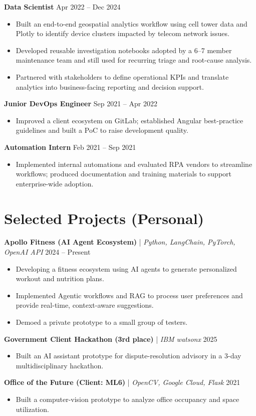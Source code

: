 \documentclass[10pt,a4paper]{article}
\begin{document}
\textbf{Data Scientist} \hfill Apr 2022 -- Dec 2024\\
\begin{itemize}
  \item Built an end-to-end geospatial analytics workflow using cell tower data and Plotly to identify device clusters impacted by telecom network issues.
  \item Developed reusable investigation notebooks adopted by a 6--7 member maintenance team and still used for recurring triage and root-cause analysis.
  \item Partnered with stakeholders to define operational KPIs and translate analytics into business-facing reporting and decision support.
\end{itemize}
\textbf{Junior DevOps Engineer} \hfill Sep 2021 -- Apr 2022\\
\begin{itemize}
  \item Improved a client ecosystem on GitLab; established Angular best-practice guidelines and built a PoC to raise development quality.
\end{itemize}
\textbf{Automation Intern} \hfill Feb 2021 -- Sep 2021\\
\begin{itemize}
  \item Implemented internal automations and evaluated RPA vendors to streamline workflows; produced documentation and training materials to support enterprise-wide adoption.
\end{itemize}

\section*{Selected Projects (Personal)}
\textbf{Apollo Fitness (AI Agent Ecosystem)} | \textit{Python, LangChain, PyTorch, OpenAI API} \hfill 2024 -- Present\\
\begin{itemize}
  \item Developing a fitness ecosystem using AI agents to generate personalized workout and nutrition plans.
  \item Implemented Agentic workflows and RAG to process user preferences and provide real-time, context-aware suggestions.
  \item Demoed a private prototype to a small group of testers.
\end{itemize}
\textbf{Government Client Hackathon (3rd place)} | \textit{IBM watsonx} \hfill 2025\\
\begin{itemize}
  \item Built an AI assistant prototype for dispute-resolution advisory in a 3-day multidisciplinary hackathon.
\end{itemize}
\textbf{Office of the Future (Client: ML6)} | \textit{OpenCV, Google Cloud, Flask} \hfill 2021\\
\begin{itemize}
  \item Built a computer-vision prototype to analyze office occupancy and space utilization.
\end{itemize}
\end{document}
